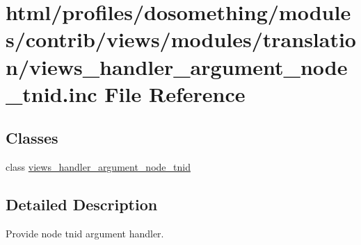 \hypertarget{views__handler__argument__node__tnid_8inc}{
\section{html/profiles/dosomething/modules/contrib/views/modules/translation/views\_\-handler\_\-argument\_\-node\_\-tnid.inc File Reference}
\label{views__handler__argument__node__tnid_8inc}
}
\subsection*{Classes}
\begin{DoxyCompactItemize}
\item 
class \hyperlink{classviews__handler__argument__node__tnid}{views\_\-handler\_\-argument\_\-node\_\-tnid}
\end{DoxyCompactItemize}


\subsection{Detailed Description}
Provide node tnid argument handler. 